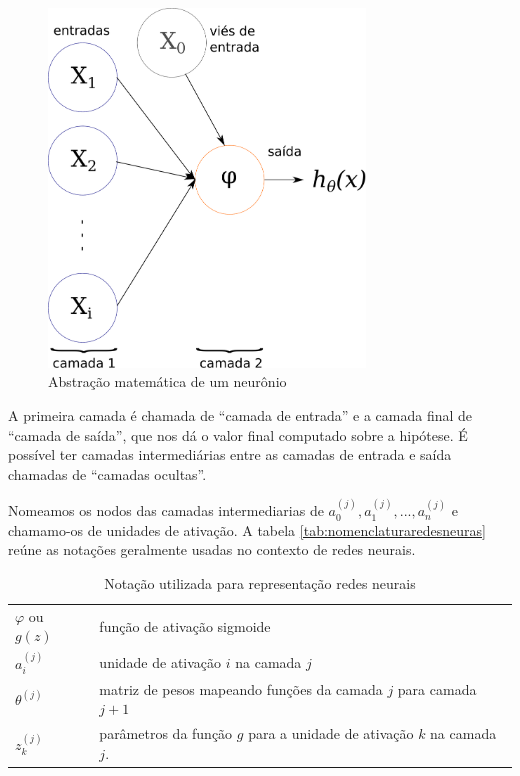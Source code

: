 \begin{figure}
\centering
\caption{Abstração matemática de um neurônio} \label{fig:neuroniomat}
\includegraphics[width=0.75\textwidth]{img/redeneuralmat.pdf}
\end{figure}


A primeira camada é chamada de ``camada de entrada'' e a camada final de ``camada de saída'', que nos dá o valor final computado sobre a hipótese. É possível ter camadas intermediárias entre as camadas de entrada e saída chamadas de ``camadas ocultas''. 

Nomeamos os nodos das camadas intermediarias de $a_0^{(j)}, a_1^(j), ..., a_n^(j)$ e chamamo-os de unidades de ativação. A tabela \autoref{tab:nomenclaturaredesneuras} reúne as notações geralmente usadas no contexto de redes neurais.

\begin{table}[!htb]
\caption{Notação utilizada para representação redes neurais} \label{tab:nomenclaturaredesneuras}
\begin{center}
\begin{tabular}{m{2cm}m{12.0cm}}
  \toprule
  $\varphi$ ou $g(z)$ & função de ativação sigmoide\\
  $a_i^{(j)}$ 	   & unidade de ativação $i$ na camada $j$ \\
  $\theta^{(j)}$   & matriz de pesos mapeando funções da camada $j$ para camada $j+1$  \\
  $z_k^{(j)}$	&	parâmetros da função $g$ para a unidade de ativação $k$ na camada $j$. \\
  \bottomrule
\end{tabular}
\end{center}

\end{table}


